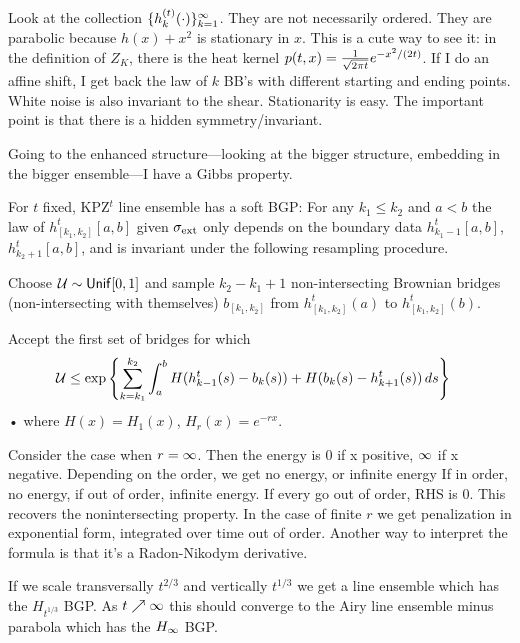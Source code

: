 Look at the collection $\{h_k^{(t)}(\cdot)\}_{k=1}^\iy$. They are not necessarily ordered. They are parabolic because $h(x)+x^2$ %
is stationary in $x$. This is a cute way to see it: in the definition of $Z_K$, there is the heat kernel $p(t,x) = \rc{\sqrt{2\pi t}}e^{-x^2/(2t)}$. If I do an affine shift, I get back the law of $k$ BB's with different starting and ending points. White noise is also invariant to the shear. Stationarity is easy. The important point is that there is a hidden symmetry/invariant. 

Going to the enhanced structure---looking at the bigger structure, embedding in the bigger ensemble---I have a Gibbs property.
\begin{thm}
For $t$ fixed, KPZ$^t$ line ensemble has a soft BGP:
For any $k_1\le k_2$ and $a<b$ the law of $h_{[k_1,k_2]}^t[a,b]$ given $\si_{\text{ext}}$ only depends on the boundary data $h_{k_1-1}^t [a,b]$, $h_{k_2+1}^t[a,b]$, and is invariant under the following resampling procedure.

Choose $\cal U\sim \mathsf{Unif}[0,1]$ and sample $k_2-k_1+1$ non-intersecting Brownian bridges (non-intersecting with themselves) $b_{[k_1,k_2]}$ from $h_{[k_1,k_2]}^t (a)$ to $h_{[k_1,k_2]}^t(b)$. %

Accept the first set of bridges for which 
\begin{align*}
\cal U&\le 
\exp\bc{
\sum_{k=k_1}^{k_2}\int_a^b H(h_{k-1}^t(s)-b_k(s)) + H(b_k(s)-h_{k+1}^t(s))\,ds
}%
\end{align*}•
where $H(x)=H_1(x)$, $H_r(x)=e^{-rx}$. 
\end{thm}
Consider the case when $r=\iy$. 
Then the energy is 0 if x positive, $\iy$ if x negative.
Depending on the order, we get no energy, or infinite energy
If in order, no energy, if out of order, infinite energy.
If every go out of order, RHS is 0.
This recovers the nonintersecting property.
In the case of finite $r$ we get penalization in exponential form, integrated over time out of order.
Another way to interpret the formula is that it's a Radon-Nikodym derivative.

\begin{conj}
If we scale transversally $t^{2/3}$ and vertically $t^{1/3}$ we get a line ensemble which has the $H_{t^{1/3}}$ BGP. As $t\nearrow \iy$ this should converge to the Airy line ensemble minus parabola which has the $H_\iy$ BGP.
\end{conj}

